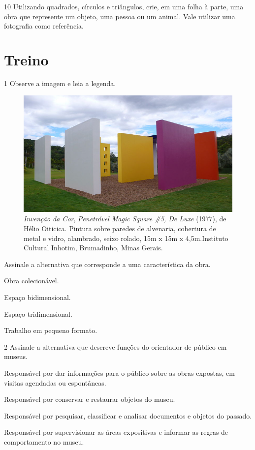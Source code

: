 \num{10} Utilizando quadrados, círculos e triângulos, crie, em uma folha à parte,
uma obra que represente um objeto, uma pessoa ou um animal. Vale utilizar uma fotografia como referência.


\section*{Treino}

\num{1} Observe a imagem e leia a legenda.

\begin{figure}[htpb!]
\includegraphics[width=\textwidth]{./imgs/art9.png}
\caption{\emph{Invenção da Cor}, \emph{Penetrável Magic Square \#5, De Luxe} (1977), de Hélio Oiticica. Pintura sobre paredes de alvenaria, cobertura de metal e vidro, alambrado, seixo rolado, 15m x 15m x 4,5m.Instituto Cultural Inhotim, Brumadinho, Minas Gerais.}
\end{figure}

Assinale a alternativa que corresponde a uma característica da obra.

\begin{escolha}
\item
  Obra colecionável.
\item
  Espaço bidimensional.
\item
  Espaço tridimensional.
\item
  Trabalho em pequeno formato.
\end{escolha}


\pagebreak
\num{2} Assinale a alternativa que descreve funções do orientador de público em museus.

\begin{escolha}
\item
  Responsável por dar informações para o público sobre as obras
  expostas, em visitas agendadas ou espontâneas.
\item
  Responsável por conservar e restaurar objetos do museu.
\item
  Responsável por pesquisar, classificar e analisar documentos e objetos
  do passado.
\item
  Responsável por supervisionar as áreas expositivas e informar as
  regras de comportamento no museu.
\end{escolha}



